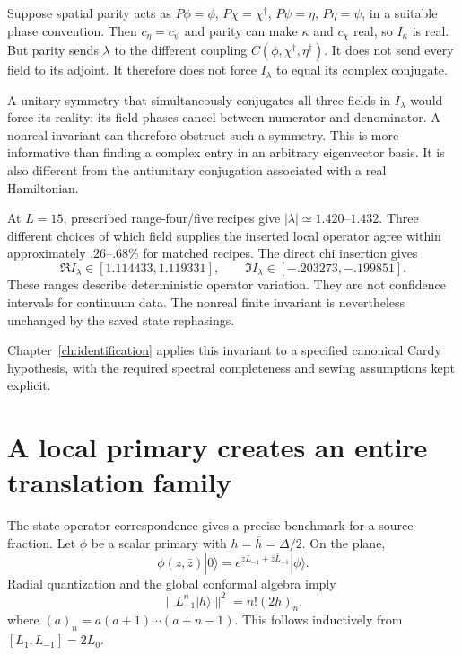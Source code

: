 \begin{example}
Suppose spatial parity acts as
$P\phi=\phi$, $P\chi=\chi^\dagger$,
$P\psi=\eta$, $P\eta=\psi$, in a suitable phase convention.
Then $c_\eta=c_\psi$ and parity can make $\kappa$ and $c_\chi$ real,
so $I_\kappa$ is real. But parity sends $\lambda$ to the different
coupling $C(\phi,\chi^\dagger,\eta^\dagger)$. It does not send every
field to its adjoint. It therefore does not force $I_\lambda$ to equal
its complex conjugate.
\end{example}

A unitary symmetry that simultaneously conjugates all three fields in
$I_\lambda$ would force its reality: its field phases cancel between
numerator and denominator. A nonreal invariant can therefore obstruct
such a symmetry. This is more informative than finding a complex entry
in an arbitrary eigenvector basis. It is also different from the
antiunitary conjugation associated with a real Hamiltonian.

\begin{numericalrecord}
At $L=15$, prescribed range-four/five recipes give
$|\lambda|\simeq1.420$--$1.432$. Three different choices of which
field supplies the inserted local operator agree within approximately
$.26$--$.68\%$ for matched recipes. The direct chi insertion gives
\[
 \Re I_\lambda\in[1.114433,1.119331],\qquad
 \Im I_\lambda\in[-.203273,-.199851].
\]
These ranges describe deterministic operator variation. They are not
confidence intervals for continuum data. The nonreal finite invariant
is nevertheless unchanged by the saved state rephasings.
\end{numericalrecord}
Chapter~\ref{ch:identification} applies this invariant to a specified
canonical Cardy hypothesis, with the required spectral completeness
and sewing assumptions kept explicit.

\section{A local primary creates an entire translation family}

The state-operator correspondence gives a precise benchmark for a source
fraction. Let $\phi$ be a scalar primary with $h=\bar h=\Delta/2$.
On the plane,
\[
 \phi(z,\bar z)|0\rangle
 =e^{zL_{-1}+\bar z\bar L_{-1}}|\phi\rangle.
\]
Radial quantization and the global conformal algebra imply
\[
 \|L_{-1}^n|h\rangle\|^2=n!(2h)_n,
\]
where $(a)_n=a(a+1)\cdots(a+n-1)$. This follows inductively from
$[L_1,L_{-1}]=2L_0$.

